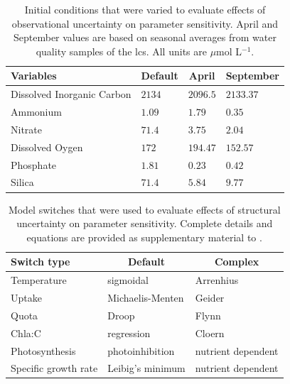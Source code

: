 \documentclass[letterpaper,12pt,oneside]{article}\usepackage[]{graphicx}\usepackage[]{color}
\begin{document}
\clearpage
\begin{singlespace}


\end{singlespace}
\clearpage


\begin{table}[!tbp]
\caption{Initial conditions that were varied to evaluate effects of observational uncertainty on parameter sensitivity.  April and September values are based on seasonal averages from water quality samples of the \ac{lcs}.  All units are $\mu$mol L$^{-1}$.\label{tab:inits}} 
\begin{center}
\begin{tabular}{llll}
\hline\hline
\multicolumn{1}{l}{Variables}&\multicolumn{1}{c}{Default}&\multicolumn{1}{c}{April}&\multicolumn{1}{c}{September}\tabularnewline
\hline
Dissolved Inorganic Carbon&$2134$&$2096.5$&$2133.37$\tabularnewline
Ammonium&$1.09$&$1.79$&$0.35$\tabularnewline
Nitrate&$71.4$&$3.75$&$2.04$\tabularnewline
Dissolved Oygen&$172$&$194.47$&$152.57$\tabularnewline
Phosphate&$1.81$&$0.23$&$0.42$\tabularnewline
Silica&$71.4$&$5.84$&$9.77$\tabularnewline
\hline
\end{tabular}\end{center}

\end{table}


\begin{table}[!tbp]
\caption{Model switches that were used to evaluate effects of structural uncertainty on parameter sensitivity. Complete details and equations are provided as supplementary material to .\label{tab:strcs}} 
\begin{center}
\begin{tabular}{lll}
\hline\hline
\multicolumn{1}{l}{Switch type}&\multicolumn{1}{c}{Default}&\multicolumn{1}{c}{Complex}\tabularnewline
\hline
Temperature&sigmoidal {\scriptsize \citep{Eldridge10}}&Arrenhius {\scriptsize \citep{Geider97}}\tabularnewline
Uptake&Michaelis-Menten {\scriptsize \citep{Dugdale67}}&Geider {\scriptsize \citep{Lehman75,Geider98}}\tabularnewline
Quota&Droop {\scriptsize \citep{Droop73}}&Flynn {\scriptsize \citep{Flynn03}}\tabularnewline
Chla:C&regression {\scriptsize \citep{Murrell14}}&Cloern {\scriptsize \citep{Cloern95}}\tabularnewline
Photosynthesis&photoinhibition {\scriptsize \citep{Platt80}}&nutrient dependent\tabularnewline
Specific growth rate&Leibig's minimum&nutrient dependent\tabularnewline
\hline
\end{tabular}\end{center}

\end{table}
\end{document}
